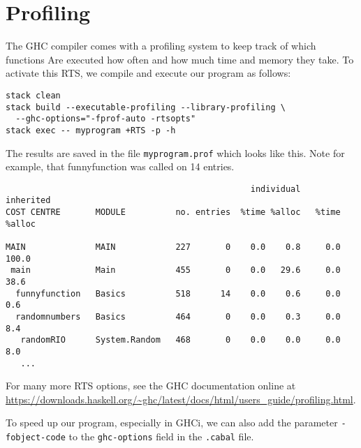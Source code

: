 
\section{Profiling}
\label{sec:Profiling}

The GHC compiler comes with a profiling system to keep track of which
functions Are executed how often and how much time and memory they take.
To activate this RTS, we compile and execute our program as follows:

\begin{verbatim}
stack clean
stack build --executable-profiling --library-profiling \
  --ghc-options="-fprof-auto -rtsopts"
stack exec -- myprogram +RTS -p -h
\end{verbatim}

The results are saved in the file \texttt{myprogram.prof} which looks like this.
Note for example, that funnyfunction was called on 14 entries.

\begin{small}
\begin{verbatim}
                                                 individual      inherited
COST CENTRE       MODULE          no. entries  %time %alloc   %time %alloc

MAIN              MAIN            227       0    0.0    0.8     0.0  100.0
 main             Main            455       0    0.0   29.6     0.0   38.6
  funnyfunction   Basics          518      14    0.0    0.6     0.0    0.6
  randomnumbers   Basics          464       0    0.0    0.3     0.0    8.4
   randomRIO      System.Random   468       0    0.0    0.0     0.0    8.0
   ...
\end{verbatim}
\end{small}

For many more RTS options, see the GHC documentation online at
\url{https://downloads.haskell.org/~ghc/latest/docs/html/users_guide/profiling.html}.

To speed up our program, especially in GHCi, we can also add the
parameter \texttt{-fobject-code} to the \texttt{ghc-options} field
in the \texttt{.cabal} file.
